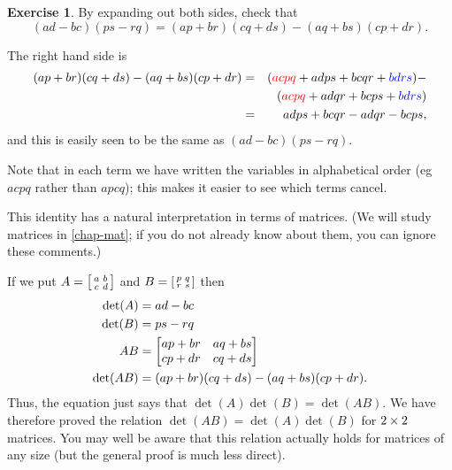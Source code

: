 \documentclass[a4paper]{book}
\theoremstyle{definition}
\newtheorem{exercise}[theorem]{Exercise}
\renewenvironment{solution}{\SolutionInline}{\endSolutionInline}
\begin{document}
\begin{exercise}
 By expanding out both sides, check that
 \[ (ad-bc)(ps-rq) = (ap+br)(cq+ds) - (aq+bs)(cp+dr). \]
\end{exercise}
\begin{solution}
 The right hand side is
 \begin{eqnarray*}
  (ap+br)(cq+ds) - (aq+bs)(cp+dr)
   &=& ({\color{red} acpq} + adps + bcqr + {\color{blue} bdrs}) - \\
   & & ({\color{red} acpq} + adqr + bcps + {\color{blue} bdrs}) \\
   &=& adps + bcqr - adqr - bcps,
 \end{eqnarray*}
 and this is easily seen to be the same as $(ad-bc)(ps-rq)$.

 Note that in each term we have written the variables in alphabetical
 order (eg $acpq$ rather than $apcq$); this makes it easier to see
 which terms cancel.
\end{solution}
\begin{background}
 This identity has a natural interpretation in terms of matrices.
 (We will study matrices in \autoref{chap-mat}; if you do not already
 know about them, you can ignore these comments.)

 If we put $A=\left[\begin{smallmatrix} a&b\\ c&d\end{smallmatrix}\right]$ and $B=\left[\begin{smallmatrix} p&q\\ r&s\end{smallmatrix}\right]$ then
 \begin{align*}
  \det(A)  &= ad-bc \\
  \det(B)  &= ps-rq \\
  AB       &= \begin{bmatrix} ap+br & aq+bs \\ cp+dr & cq+ds \end{bmatrix} \\
  \det(AB) &= (ap+br)(cq+ds) - (aq+bs)(cp+dr).
 \end{align*}
 Thus, the equation just says that $\det(A)\det(B)=\det(AB)$.  We have
 therefore proved the relation $\det(AB)=\det(A)\det(B)$ for $2\times 2$
 matrices.  You may well be aware that this relation actually holds
 for matrices of any size (but the general proof is much less direct).
\end{background}
\end{document}
